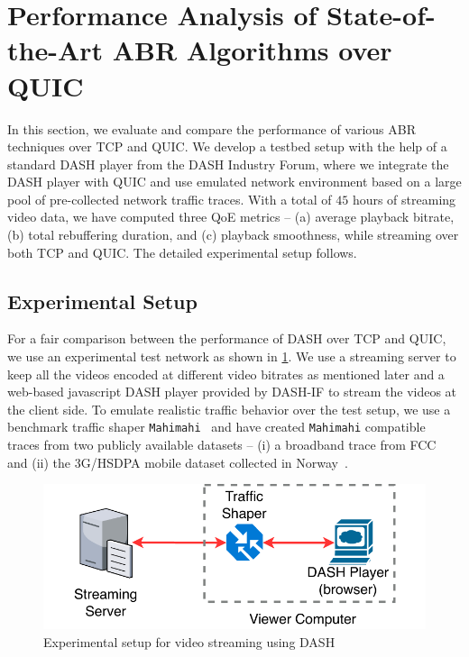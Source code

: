 \section{Performance Analysis of State-of-the-Art ABR Algorithms over QUIC}
In this section, we evaluate and compare the performance of various ABR
techniques over \ac{TCP} and \ac{QUIC}. We develop a testbed setup with the help of a standard DASH player from the \ac{DASH} Industry Forum, where we integrate the \ac{DASH} player with \ac{QUIC} and use emulated network environment based on a large pool of pre-collected network traffic traces. With a total of $45$ hours of streaming video data, we have computed three \ac{QoE} metrics -- (a) average playback bitrate, (b) total rebuffering duration, and (c) playback smoothness, while streaming over both \ac{TCP} and \ac{QUIC}. The detailed experimental setup follows. 

\subsection{Experimental Setup}
\label{chap03s2:sec:experimentalSetup}
For a fair comparison between the performance of \ac{DASH} over \ac{TCP} and \ac{QUIC},
we use an experimental test network as shown in \fig\ref{fig:chap03s2:expeirmental_setup}. We use a streaming server to keep all the videos encoded at different video bitrates as mentioned later and a web-based javascript DASH player provided by \ac{DASH-IF} to stream the videos at the client side. To emulate realistic traffic behavior over the test setup, we use a benchmark traffic shaper {\tt Mahimahi}~\cite{mahimahi} and have created {\tt Mahimahi} compatible traces from two publicly available datasets -- (i) a broadband trace from FCC~\cite{dataset-fcc} and (ii) the 3G/HSDPA mobile dataset collected in Norway~\cite{dataset-norway}.

\begin{figure}[h]
	\centering
	\includegraphics[width=0.8\linewidth]{img/experimental_setup}
	\caption{\label{fig:chap03s2:expeirmental_setup}Experimental setup for video streaming using DASH}
\end{figure}


